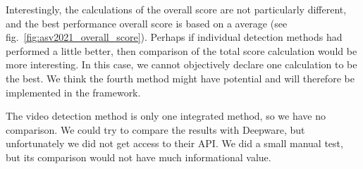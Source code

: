 Interestingly, the calculations of the overall score are not particularly different, and the best performance overall score is based on a average (see fig.~\ref{fig:asv2021_overall_score}). Perhaps if individual detection methods had performed a little better, then comparison of the total score calculation would be more interesting. In this case, we cannot objectively declare one calculation to be the best. We think the fourth method might have potential and will therefore be implemented in the framework. 

The video detection method is only one integrated method, so we have no comparison. We could try to compare the results with Deepware, but unfortunately we did not get access to their API. We did a small manual test, but its comparison would not have much informational value.

